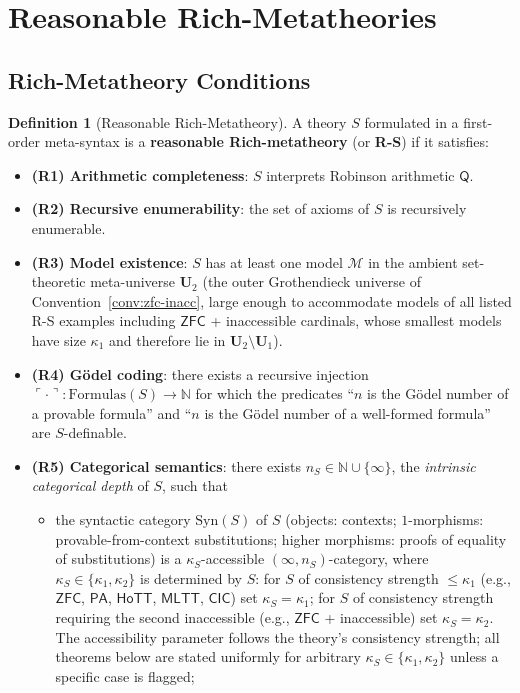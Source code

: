 \documentclass[11pt]{article}
\theoremstyle{plain}
\theoremstyle{definition}
\newtheorem{definition}[theorem]{Definition}
\newcommand{\cM}{\mathcal{M}}
\newcommand{\Syn}{\mathrm{Syn}}
\newcommand{\PA}{\mathsf{PA}}
\newcommand{\ZFC}{\mathsf{ZFC}}
\newcommand{\MLTT}{\mathsf{MLTT}}
\newcommand{\HoTT}{\mathsf{HoTT}}
\newcommand{\CIC}{\mathsf{CIC}}
\begin{document}
\section{Reasonable Rich-Metatheories}\label{sec:rs}

\subsection{Rich-Metatheory Conditions}

\begin{definition}[Reasonable Rich-Metatheory]\label{def:rs}
A theory $S$ formulated in a first-order meta-syntax is a \textbf{reasonable Rich-metatheory} (or \textbf{R-S}) if it satisfies:
\begin{itemize}
\item \textbf{(R1) Arithmetic completeness}: $S$ interprets Robinson arithmetic $\mathsf{Q}$.
\item \textbf{(R2) Recursive enumerability}: the set of axioms of $S$ is recursively enumerable.
\item \textbf{(R3) Model existence}: $S$ has at least one model $\cM$ in the ambient set-theoretic meta-universe $\mathbf{U}_2$ (the outer Grothendieck universe of Convention~\ref{conv:zfc-inacc}, large enough to accommodate models of all listed R-S examples including $\ZFC$ + inaccessible cardinals, whose smallest models have size $\kappa_1$ and therefore lie in $\mathbf{U}_2 \setminus \mathbf{U}_1$).
\item \textbf{(R4) G\"odel coding}: there exists a recursive injection $\ulcorner \cdot \urcorner : \mathrm{Formulas}(S) \to \mathbb{N}$ for which the predicates ``$n$ is the G\"odel number of a provable formula'' and ``$n$ is the G\"odel number of a well-formed formula'' are $S$-definable.
\item \textbf{(R5) Categorical semantics}: there exists $n_S \in \mathbb{N} \cup \{\infty\}$, the \emph{intrinsic categorical depth} of $S$, such that
\begin{itemize}
\item[\textbf{(R5a)}] the syntactic category $\Syn(S)$ of $S$ (objects: contexts; $1$-morphisms: provable-from-context substitutions; higher morphisms: proofs of equality of substitutions) is a $\kappa_S$-accessible $(\infty, n_S)$-category, where $\kappa_S \in \{\kappa_1, \kappa_2\}$ is determined by $S$: for $S$ of consistency strength $\leq \kappa_1$ (e.g., $\ZFC$, $\PA$, $\HoTT$, $\MLTT$, $\CIC$) set $\kappa_S = \kappa_1$; for $S$ of consistency strength requiring the second inaccessible (e.g., $\ZFC$ + inaccessible) set $\kappa_S = \kappa_2$. The accessibility parameter follows the theory's consistency strength; all theorems below are stated uniformly for arbitrary $\kappa_S \in \{\kappa_1, \kappa_2\}$ unless a specific case is flagged;

\end{itemize}
\end{itemize}
\end{definition}
\end{document}
